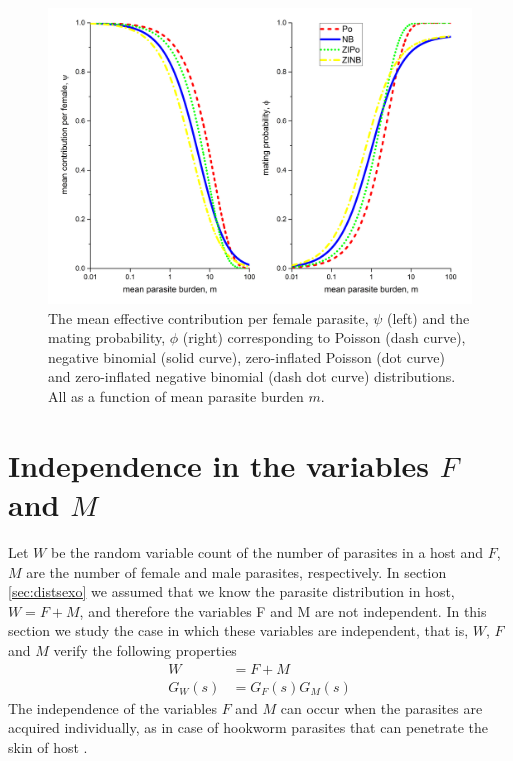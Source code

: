 \documentclass[bimj,fleqn]{w-art}
\theoremstyle{plain}
\theoremstyle{definition}
\begin{document}
\begin{figure}[h!]
	\centering
	\includegraphics[width=0.99\linewidth]{functionv3}
	\caption{The mean effective contribution per female parasite, $\psi$ (left) and the mating probability, $\phi$ (right) corresponding to Poisson (dash curve), negative binomial (solid curve), zero-inflated Poisson (dot curve) and zero-inflated negative binomial (dash dot curve) distributions. All as a function of mean parasite burden $m$.}
	\label{fig:phi}
\end{figure}


\section{Independence in the variables $F$ and $M$}\label{sec:disindep}
Let $W$ be the random variable count of the number of parasites in a host and $F$, $M$ are the number of female and male parasites, respectively.
In section \ref{sec:distsexo} we assumed that we know the parasite distribution in host, $W=F+M$, and therefore  the variables F and M are not independent.
In this section we study the case in which these variables are independent, that is, $W$, $F$ and $M$ verify the following properties
\begin{equation}\label{independencia}
\begin{split}
W&=F+M\\
G_W(s)&=G_F(s)G_M(s)
\end{split}
\end{equation}
The independence of the variables $F$ and $M$ can occur when the parasites are acquired individually, as in case of hookworm parasites that can penetrate the skin of host \cite{bethony2006soil,hotez2004hookworm}.
\end{document}
